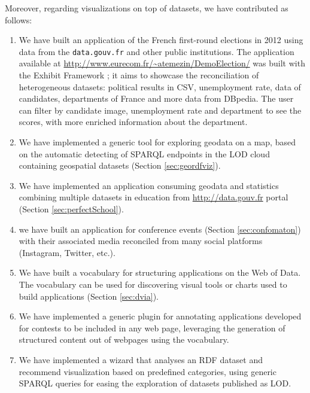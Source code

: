 Moreover, regarding visualizations on top of datasets, we have contributed as follows:
\begin{enumerate}


\item We have built an application of the French first-round elections in 2012 using data from the \texttt{data.gouv.fr} and other public institutions. The application available at \url{http://www.eurecom.fr/~atemezin/DemoElection/} was built with the Exhibit Framework \cite{exhibit2007}; it aims to showcase the reconciliation of heterogeneous datasets: political results in CSV, unemployment rate, data of candidates, departments of France and more data from DBpedia. The user can filter by candidate image, unemployment rate and department to see the scores, with more enriched information about the department.
 
\item We have implemented a generic tool for exploring geodata on a map, based on the automatic detecting of SPARQL endpoints in the LOD cloud containing geospatial datasets (Section \ref{sec:geordfviz}). 

\item We have implemented an application consuming geodata and statistics combining multiple datasets in education from \url{http://data.gouv.fr} portal (Section \ref{sec:perfectSchool}).

\item we have built an application for conference events (Section \ref{sec:confomaton}) with their associated media reconciled from many social platforms (Instagram, Twitter, etc.).

\item We have built a vocabulary for structuring applications on the Web of Data. The vocabulary can be used for discovering visual tools or charts used to build applications (Section \ref{sec:dvia}). 

\item We have implemented a generic plugin for annotating applications developed for contests to be included in any web page, leveraging  the generation of structured content out of webpages using the vocabulary. 


\item We have implemented a wizard that analyses an RDF dataset and recommend visualization based on predefined categories, using generic SPARQL queries for easing the exploration of datasets published as LOD. 


\end{enumerate}

